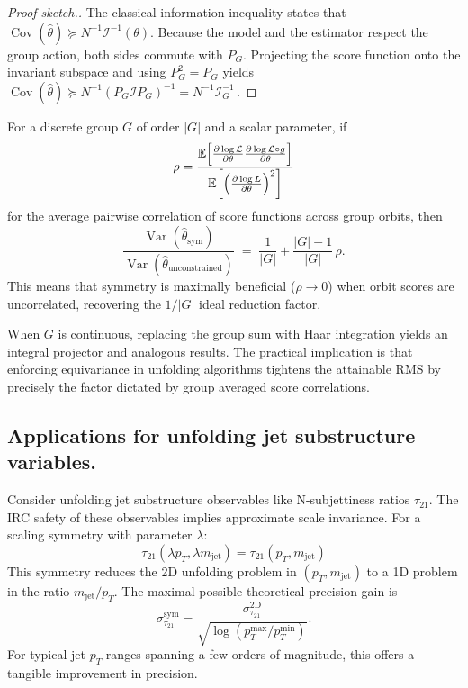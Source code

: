 \begin{proof}[Proof sketch.]
The classical information inequality states that
\(\operatorname{Cov}(\hat\theta)\succeq N^{-1}\mathcal I^{-1}(\theta)\).
Because the model and the estimator respect the group action, both sides commute with \(P_G\).  
Projecting the score function onto the invariant subspace and using \(P_G^2=P_G\) yields  
\(\operatorname{Cov}(\hat\theta)\succeq N^{-1}(P_G\mathcal I P_G)^{-1}=N^{-1}\mathcal I_G^{-1}\,\).
\end{proof}

\begin{corollary}
For a discrete group \(G\) of order \(|G|\) and a scalar parameter, if  
\[\rho=\frac{\mathbb{E}\qty[\pdv{\log \mathcal L}{\theta}\pdv{\log \mathcal L\circ g}{\theta}]}
          {\mathbb{E}\qty[\qty(\pdv{\log L}{\theta})^2]}
\] for the average pairwise correlation of score functions across group orbits,  
then
\[
  \frac{\operatorname{Var}(\hat\theta_{\text{sym}})}
       {\operatorname{Var}(\hat\theta_{\text{unconstrained}})}
  \;=\;
  \frac{1}{|G|}+\frac{|G|-1}{|G|}\,\rho.
\]
This means that symmetry is maximally beneficial (\(\rho \to 0\)) when orbit scores are uncorrelated, recovering the \(1/|G|\) ideal reduction factor.
\end{corollary}

When \(G\) is continuous, replacing the group sum with Haar integration yields an integral projector and analogous results.
%
The practical implication is that enforcing equivariance in unfolding algorithms tightens the attainable RMS by precisely the factor dictated by group averaged score correlations.


    \subsection{Applications for unfolding jet substructure variables.}
        Consider unfolding jet substructure observables like N-subjettiness ratios \(\tau_{21}\).
        The IRC safety of these observables implies approximate scale invariance.
        For a scaling symmetry with parameter \(\lambda\):
        \[
            \tau_{21}(\lambda p_T, \lambda m_\text{jet}) = \tau_{21}(p_T, m_\text{jet})
        \]
        This symmetry reduces the 2D unfolding problem in \((p_T, m_\text{jet})\) to a 1D problem in the ratio \(m_\text{jet}/p_T\).
        The maximal possible theoretical precision gain is
        \[
            \sigma_{\tau_{21}}^\text{sym} = \frac{\sigma_{\tau_{21}}^\text{2D}}{\sqrt{\log(p_T^\text{max}/p_T^\text{min})}}.
        \]
        For typical jet \(p_T\) ranges spanning a few orders of magnitude, this offers a tangible improvement in precision.

